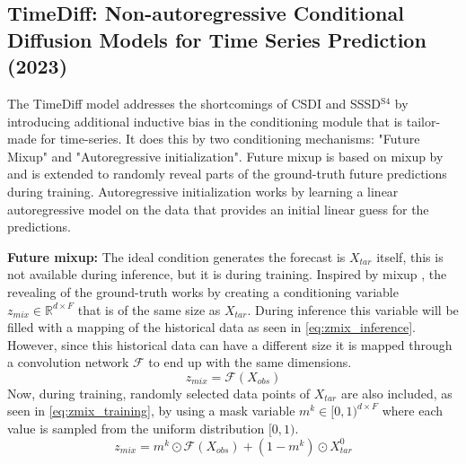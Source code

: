 \subsection{TimeDiff: Non-autoregressive Conditional Diffusion Models for Time Series Prediction (2023) \cite{shen_non-autoregressive_2023}} \label{sec:timediff}
The TimeDiff model addresses the shortcomings of CSDI and SSSD$^{\text{S4}}$ by introducing additional inductive bias in the conditioning module that is tailor-made for time-series. It does this by two conditioning mechanisms: "Future Mixup" and "Autoregressive initialization".
Future mixup is based on mixup by \textcite{zhang_mixup_2018} and is extended to randomly reveal parts of the ground-truth future predictions during training. Autoregressive initialization works by learning a linear autoregressive model on the data that provides an initial linear guess for the predictions. 

\textbf{Future mixup:}
The ideal condition generates the forecast is $X_{tar}$ itself, this is not available during inference, but it is during training. Inspired by mixup \cite{zhang_mixup_2018}, the revealing of the ground-truth works by creating a conditioning variable $z_{mix} \in \mathbb{R}^{d \times F}$ that is of the same size as $X_{tar}$. During inference this variable will be filled with a mapping of the historical data as seen in \autoref{eq:zmix_inference}. However, since this historical data can have a different size it is mapped through a convolution network $\mathcal{F}$ to end up with the same dimensions.
\begin{equation} \label{eq:zmix_inference}
    z_{mix} = \mathcal{F}(X_{obs})
\end{equation}
Now, during training, randomly selected data points of $X_{tar}$ are also included, as seen in \autoref{eq:zmix_training}, by using a mask variable $m^k \in [0,1)^{d \times F}$ where each value is sampled from the uniform distribution $[0, 1)$.
\begin{equation} \label{eq:zmix_training}
    z_{mix} = m^k \odot \mathcal{F}(X_{obs}) + (1 - m^k) \odot X_{tar}^0
\end{equation}

